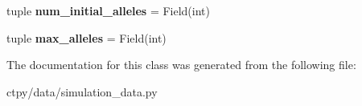 \begin{DoxyCompactItemize}
\item 
\hypertarget{classctpy_1_1data_1_1simulation__data_1_1_simulation_run_a8c0a7043a1b310f2a49caff66a543f5f}{tuple {\bfseries num\-\_\-initial\-\_\-alleles} = Field(int)}\label{classctpy_1_1data_1_1simulation__data_1_1_simulation_run_a8c0a7043a1b310f2a49caff66a543f5f}

\item 
\hypertarget{classctpy_1_1data_1_1simulation__data_1_1_simulation_run_a6d3b9e680dcdbf92fdf89a43fc3656a5}{tuple {\bfseries max\-\_\-alleles} = Field(int)}\label{classctpy_1_1data_1_1simulation__data_1_1_simulation_run_a6d3b9e680dcdbf92fdf89a43fc3656a5}

\end{DoxyCompactItemize}


The documentation for this class was generated from the following file\-:\begin{DoxyCompactItemize}
\item 
ctpy/data/simulation\-\_\-data.\-py\end{DoxyCompactItemize}
